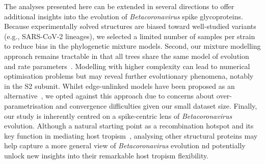 The analyses presented here can be extended in several directions to offer additional insights into the evolution of \textit{Betacoronavirus} spike glycoproteins. Because experimentally solved structures are biased toward well-studied variants~\cite{scheidwasser2025a} (e.g., SARS-CoV-2 lineages), we selected a limited number of samples per strain to reduce bias in the phylogenetic mixture models. Second, our mixture modelling approach remains tractable in that all trees share the same model of evolution and rate parameters~\cite{wong2024}. Modelling with higher complexity can lead to numerical optimisation problems but may reveal further evolutionary phenomena, notably in the S2 subunit. Whilst edge-unlinked models have been proposed as an alternative~\cite{mutti2025}, we opted against this approach due to concerns about over-parametrisation and convergence difficulties given our small dataset size. Finally, our study is inherently centred on a spike-centric lens of \textit{Betacoronavirus} evolution. Although a natural starting point as a recombination hotspot and its key function in mediating host tropism~\cite{wells2023}, analysing other structural proteins may help capture a more general view of \textit{Betacoronavirus} evolution nd potentially unlock new insights into their remarkable host tropism flexibility. %

